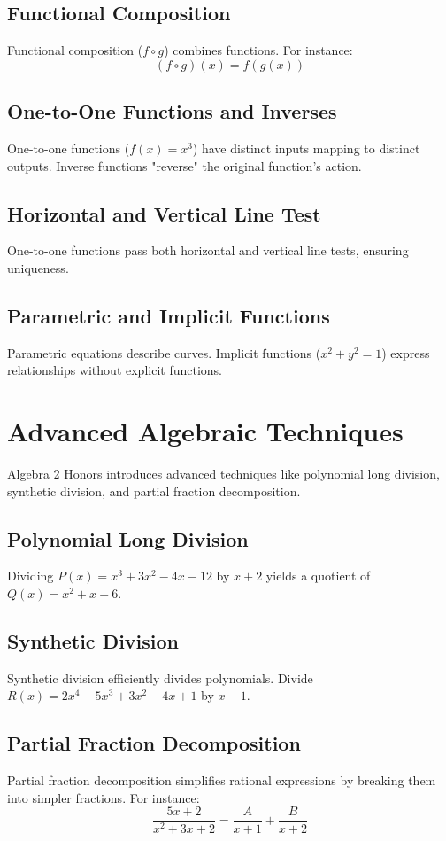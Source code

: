 \documentclass{article}
\begin{document}
\subsection{Functional Composition}
Functional composition (\(f \circ g\)) combines functions. For instance:
\[ (f \circ g)(x) = f(g(x)) \]

\subsection{One-to-One Functions and Inverses}
One-to-one functions (\(f(x) = x^3\)) have distinct inputs mapping to distinct outputs. Inverse functions "reverse" the original function's action.

\subsection{Horizontal and Vertical Line Test}
One-to-one functions pass both horizontal and vertical line tests, ensuring uniqueness.

\subsection{Parametric and Implicit Functions}
Parametric equations describe curves. Implicit functions (\(x^2 + y^2 = 1\)) express relationships without explicit functions.

\section{Advanced Algebraic Techniques}
Algebra 2 Honors introduces advanced techniques like polynomial long division, synthetic division, and partial fraction decomposition.

\subsection{Polynomial Long Division}
Dividing \(P(x) = x^3 + 3x^2 - 4x - 12\) by \(x + 2\) yields a quotient of \(Q(x) = x^2 + x - 6\).

\subsection{Synthetic Division}
Synthetic division efficiently divides polynomials. Divide \(R(x) = 2x^4 - 5x^3 + 3x^2 - 4x + 1\) by \(x - 1\).

\subsection{Partial Fraction Decomposition}
Partial fraction decomposition simplifies rational expressions by breaking them into simpler fractions. For instance:
\[ \frac{5x + 2}{x^2 + 3x + 2} = \frac{A}{x + 1} + \frac{B}{x + 2} \]
\end{document}
